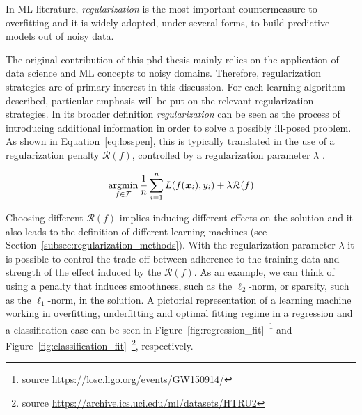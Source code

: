         In ML literature, \textit{regularization} is the most important countermeasure to overfitting and it is widely adopted, under several forms, to build predictive models out of noisy data.

	    The original contribution of this phd thesis mainly relies on the application of data science and ML concepts to noisy domains. Therefore, regularization strategies are of primary interest in this discussion.
	    For each learning algorithm described, particular emphasis will be put on the relevant regularization strategies.
	    In its broader definition \textit{regularization} can be seen as the process of introducing additional information in order to solve a possibly ill-posed problem.
			As shown in Equation~\eqref{eq:losspen}, this is typically translated in the use of a regularization penalty $\mathcal{R}(f)$, controlled by a regularization parameter $\lambda$ \cite{tikhonov1963solution, evgeniou2000regularization}.

	     \begin{equation}\label{eq:losspen}
	    	\mathop{\mathrm{argmin}}\limits_{f \in \mathcal{F}} \frac{1}{n}\sum_{i=1}^n L(f(\bm{x}_i),y_i) + \lambda \mathcal{R}(f)
	    \end{equation}

			Choosing different $\mathcal{R}(f)$ implies inducing different effects on the solution and it also leads to the definition of different learning machines (see Section~\ref{subsec:regularization_methods}).
			With the regularization parameter $\lambda$ it is possible to control the trade-off between adherence to the training data and strength of the effect induced by the $\mathcal{R}(f)$.
			As an example, we can think of using a penalty that induces smoothness, such as the $\ell_2$-norm, or sparsity, such as the $\ell_1$-norm, in the solution.
			A pictorial representation of a learning machine working in overfitting, underfitting and optimal fitting regime in a regression and a classification case can be seen in
			Figure~\ref{fig:regression_fit}~\footnote{source \url{https://losc.ligo.org/events/GW150914/}}
			and
		  Figure~\ref{fig:classification_fit}~\footnote{source \url{https://archive.ics.uci.edu/ml/datasets/HTRU2}}, respectively.


